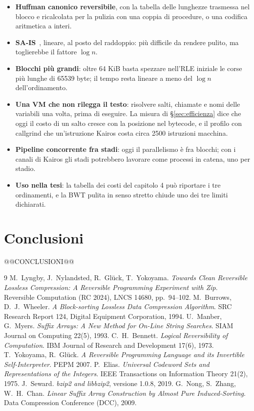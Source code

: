 \documentclass[11pt,a4paper]{article}
\begin{document}
\begin{itemize}
\item \textbf{Huffman canonico reversibile}, con la tabella delle lunghezze trasmessa nel blocco e ricalcolata per la pulizia con una coppia di procedure, o una codifica aritmetica a interi.
\item \textbf{SA-IS}~\cite{sais}, lineare, al posto del raddoppio: più difficile da rendere pulito, ma toglierebbe il fattore $\log n$.
\item \textbf{Blocchi più grandi}: oltre 64 KiB basta spezzare nell'RLE iniziale le corse più lunghe di 65539 byte; il tempo resta lineare a meno del $\log n$ dell'ordinamento.
\item \textbf{Una VM che non rilegga il testo}: risolvere salti, chiamate e nomi delle variabili una volta, prima di eseguire. La misura di §\ref{sec:efficienza} dice che oggi il costo di un salto cresce con la posizione nel bytecode, e il profilo con callgrind che un'istruzione Kairos costa circa 2500 istruzioni macchina.
\item \textbf{Pipeline concorrente fra stadi}: oggi il parallelismo è fra blocchi; con i canali di Kairos gli stadi potrebbero lavorare come processi in catena, uno per stadio.
\item \textbf{Uso nella tesi}: la tabella dei costi del capitolo 4 può riportare i tre ordinamenti, e la BWT pulita in senso stretto chiude uno dei tre limiti dichiarati.
\end{itemize}

\section{Conclusioni}

@@CONCLUSIONI@@

\begin{thebibliography}{9}
 M.~Lyngby, J.~Nylandsted, R.~Glück, T.~Yokoyama. \emph{Towards Clean Reversible Lossless Compression: A Reversible Programming Experiment with Zip}. Reversible Computation (RC 2024), LNCS 14680, pp.~94--102.
 M.~Burrows, D.~J.~Wheeler. \emph{A Block-sorting Lossless Data Compression Algorithm}. SRC Research Report 124, Digital Equipment Corporation, 1994.
 U.~Manber, G.~Myers. \emph{Suffix Arrays: A New Method for On-Line String Searches}. SIAM Journal on Computing 22(5), 1993.
 C.~H.~Bennett. \emph{Logical Reversibility of Computation}. IBM Journal of Research and Development 17(6), 1973.
 T.~Yokoyama, R.~Glück. \emph{A Reversible Programming Language and its Invertible Self-Interpreter}. PEPM 2007.
 P.~Elias. \emph{Universal Codeword Sets and Representations of the Integers}. IEEE Transactions on Information Theory 21(2), 1975.
 J.~Seward. \emph{bzip2 and libbzip2}, versione 1.0.8, 2019.
 G.~Nong, S.~Zhang, W.~H.~Chan. \emph{Linear Suffix Array Construction by Almost Pure Induced-Sorting}. Data Compression Conference (DCC), 2009.
\end{thebibliography}
\end{document}
